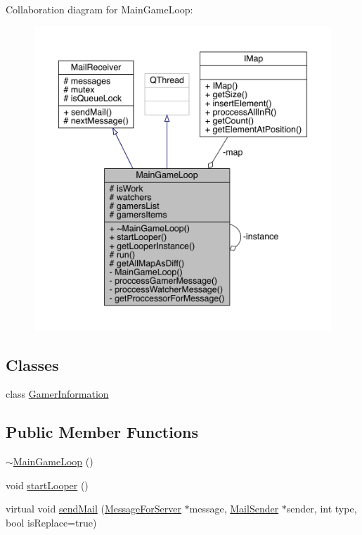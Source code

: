 Collaboration diagram for Main\+Game\+Loop\+:
\nopagebreak
\begin{figure}[H]
\begin{center}
\leavevmode
\includegraphics[width=350pt]{de/dd2/a00207}
\end{center}
\end{figure}
\subsection*{Classes}
\begin{DoxyCompactItemize}
\item 
class \hyperlink{a00213}{Gamer\+Information}
\end{DoxyCompactItemize}
\subsection*{Public Member Functions}
\begin{DoxyCompactItemize}
\item 
\hyperlink{a00209_aeeabdbe46a5aeb891d7da7fd9430d0cb}{$\sim$\+Main\+Game\+Loop} ()
\item 
void \hyperlink{a00209_a2329f4e9c9a4ad9ecbed39d5c297245f}{start\+Looper} ()
\item 
virtual void \hyperlink{a00197_a0efada2a49e9a841430a8b6f71b6803d}{send\+Mail} (\hyperlink{a00121}{Message\+For\+Server} $\ast$message, \hyperlink{a00205}{Mail\+Sender} $\ast$sender, int type, bool is\+Replace=true)
\end{DoxyCompactItemize}
